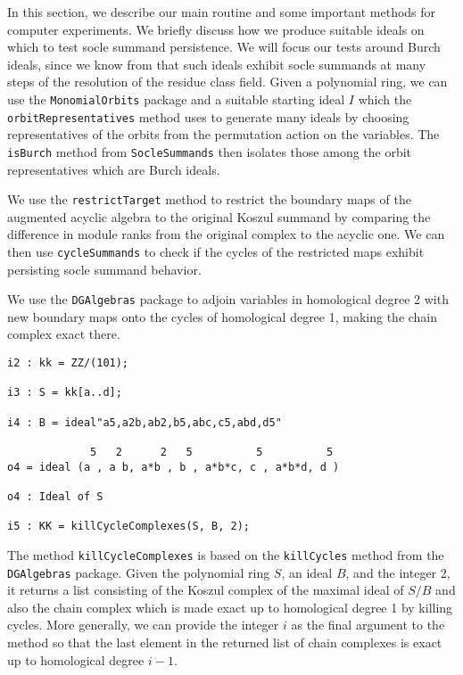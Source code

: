 \documentclass[twoside,12pt, leqno]{amsart}
\begin{document}
In this section, we describe our main routine and some important methods for computer experiments. We briefly discuss how we produce suitable ideals on which to test socle summand persistence. We will focus our tests around Burch ideals, since we know from \cite{DE23} that such ideals exhibit socle summands at many steps of the resolution of the residue class field. Given a polynomial ring, we can use the \texttt{MonomialOrbits} package and a suitable starting ideal $I$ which the \texttt{orbitRepresentatives} method uses to generate many ideals by choosing representatives of the orbits from the permutation action on the variables. The \texttt{isBurch} method from \texttt{SocleSummands} then isolates those among the orbit representatives which are Burch ideals.

We use the \texttt{restrictTarget} method to restrict the boundary maps of the augmented acyclic algebra to the original Koszul summand by comparing the difference in module ranks from the original complex to the acyclic one. We can then use \texttt{cycleSummands} to check if the cycles of the restricted maps exhibit persisting socle summand behavior.

\begin{example}
	We use the \texttt{DGAlgebras} package to adjoin variables in homological degree 2 with new boundary maps onto the cycles of homological degree 1, making the chain complex exact there.
\end{example}

\begin{footnotesize}
\begin{verbatim}
i2 : kk = ZZ/(101);

i3 : S = kk[a..d];

i4 : B = ideal"a5,a2b,ab2,b5,abc,c5,abd,d5"

             5   2      2   5          5          5
o4 = ideal (a , a b, a*b , b , a*b*c, c , a*b*d, d )

o4 : Ideal of S

i5 : KK = killCycleComplexes(S, B, 2);
\end{verbatim}
\end{footnotesize}

The method \texttt{killCycleComplexes} is based on the \texttt{killCycles} method from the \texttt{DGAlgebras} package. Given the polynomial ring $S$, an ideal $B$, and the integer 2, it returns a list consisting of the Koszul complex of the maximal ideal of $S / B$ and also the chain complex which is made exact up to homological degree 1 by killing cycles. More generally, we can provide the integer $i$ as the final argument to the method so that the last element in the returned list of chain complexes is exact up to homological degree $i-1$.
\end{document}
